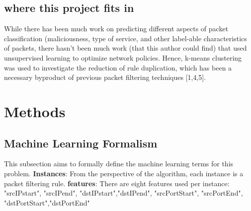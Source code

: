 \documentclass[11pt,letterpaper]{article}
\begin{document}
\subsection{where this project fits in}
While there has been much work on predicting different aspects of packet classification (maliciousness, type of service, and other label-able characteristics of packets, there hasn't been much work (that this author could find) that used unsupervised learning to optimize network policies. Hence, k-means clustering was used to investigate the reduction of rule duplication, which has been a necessary byproduct of previous packet filtering techniques [1,4,5]. 

\section{Methods}
\subsection{Machine Learning Formalism}
This subsection aims to formally define the machine learning terms for this problem.
{\bf Instances}: From the perspective of the algorithm, each instance is a packet filtering rule.
\newline
{\bf features}: There are eight features used per instance: "srcIPstart", "srcIPend", "dstIPstart","dstIPend", "srcPortStart", "srcPortEnd", "dstPortStart","dstPortEnd"
\end{document}
